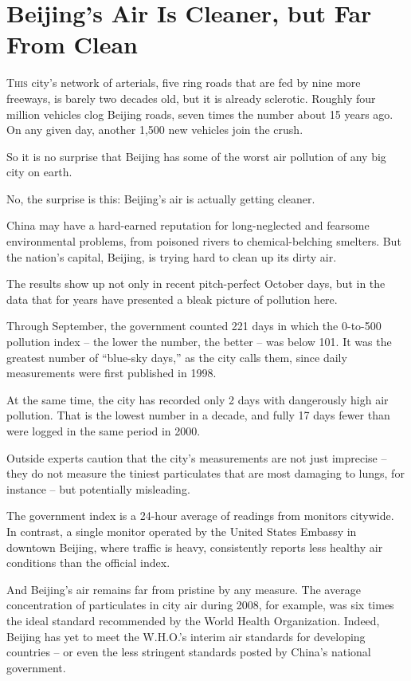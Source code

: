 ﻿\documentclass[12pt]{article}
\begin{document}
\section{Beijing's Air Is Cleaner, but Far From Clean}

\lettrine{T}{his} city's network of arterials\cite{arterial}, five ring
roads that are fed by nine more freeways, is barely two decades old, but it is already
sclerotic\cite{sclerotic}. Roughly four million vehicles clog Beijing roads, seven times the number
about 15 years ago. On any given day, another 1,500 new vehicles join the crush.

So it is no surprise that Beijing has some of the worst air pollution of any big city on earth.

No, the surprise is this: Beijing's air is actually getting cleaner.

China may have a hard-earned reputation for long-neglected and fearsome environmental problems, from
poisoned rivers to chemical-belching smelters. But the nation's capital, Beijing, is trying hard to
clean up its dirty air.

The results show up not only in recent pitch-perfect October days, but in the data that for years
have presented a bleak picture of pollution here.

Through September, the government counted 221 days in which the 0-to-500 pollution index -- the
lower the number, the better -- was below 101. It was the greatest number of ``blue-sky days,'' as
the city calls them, since daily measurements were first published in 1998.

At the same time, the city has recorded only 2 days with dangerously high air pollution. That is the
lowest number in a decade, and fully 17 days fewer than were logged in the same period in 2000.

Outside experts caution that the city's measurements are not just imprecise -- they do not measure
the tiniest particulates that are most damaging to lungs, for instance -- but potentially
misleading.

The government index is a 24-hour average of readings from monitors citywide. In contrast, a single
monitor operated by the United States Embassy in downtown Beijing, where traffic is heavy,
consistently reports less healthy air conditions than the official index.

And Beijing's air remains far from pristine\cite{pristine} by any measure. The average concentration
of particulates in city air during 2008, for example, was six times the ideal standard recommended
by the World Health Organization. Indeed, Beijing has yet to meet the W.H.O.'s interim air standards
for developing countries -- or even the less stringent standards posted by China's national
government.
\end{document}
